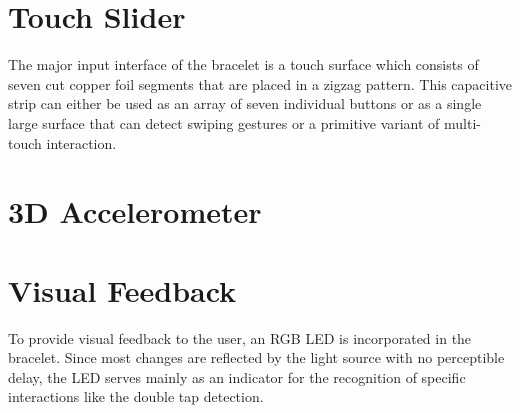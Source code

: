 \section{Touch Slider}
The major input interface of the bracelet is a touch surface which consists of seven cut copper foil segments that are placed in a zigzag pattern. This capacitive strip can either be used as an array of seven individual buttons or as a single large surface that can detect swiping gestures or a primitive variant of multi-touch interaction.

\section{3D Accelerometer}

\section{Visual Feedback}
To provide visual feedback to the user, an RGB \ac{LED} is incorporated in the bracelet. Since most changes are reflected by the light source with no perceptible delay, the \ac{LED} serves mainly as an indicator for the recognition of specific interactions like the double tap detection.